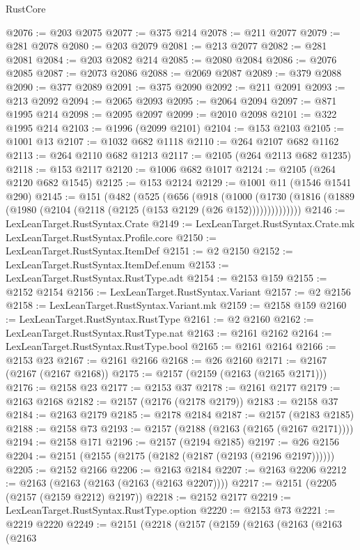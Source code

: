 \begin{lexlean}{RustCore}
\begin{coremodule}
@2076 := @203 @2075
@2077 := @375 @214
@2078 := @211 @2077
@2079 := @281 @2078
@2080 := @203 @2079
@2081 := @213 @2077
@2082 := @281 @2081
@2084 := @203 @2082 @214
@2085 := @2080 @2084
@2086 := @2076 @2085
@2087 := @2073 @2086
@2088 := @2069 @2087
@2089 := @379 @2088
@2090 := @377 @2089
@2091 := @375 @2090
@2092 := @211 @2091
@2093 := @213 @2092
@2094 := @2065 @2093
@2095 := @2064 @2094
@2097 := @871 @1995 @214
@2098 := @2095 @2097
@2099 := @2010 @2098
@2101 := @322 @1995 @214
@2103 := @1996 (@2099 @2101)
@2104 := @153 @2103
@2105 := @1001 @13
@2107 := @1032 @682 @1118
@2110 := @264 @2107 @682 @1162
@2113 := @264 @2110 @682 @1213
@2117 := @2105 (@264 @2113 @682 @1235)
@2118 := @153 @2117
@2120 := @1006 @682 @1017
@2124 := @2105 (@264 @2120 @682 @1545)
@2125 := @153 @2124
@2129 := @1001 @11 (@1546 @1541 @290)
@2145 := @151
    (@482
      (@525
        (@656
          (@918
            (@1000
              (@1730 (@1816 (@1889 (@1980 (@2104 (@2118 (@2125 (@153 @2129 (@26 @152))))))))))))))
@2146 := LexLeanTarget.RustSyntax.Crate
@2149 := LexLeanTarget.RustSyntax.Crate.mk LexLeanTarget.RustSyntax.Profile.core
@2150 := LexLeanTarget.RustSyntax.ItemDef
@2151 := @2 @2150
@2152 := LexLeanTarget.RustSyntax.ItemDef.enum
@2153 := LexLeanTarget.RustSyntax.RustType.adt
@2154 := @2153 @159
@2155 := @2152 @2154
@2156 := LexLeanTarget.RustSyntax.Variant
@2157 := @2 @2156
@2158 := LexLeanTarget.RustSyntax.Variant.mk
@2159 := @2158 @159
@2160 := LexLeanTarget.RustSyntax.RustType
@2161 := @2 @2160
@2162 := LexLeanTarget.RustSyntax.RustType.nat
@2163 := @2161 @2162
@2164 := LexLeanTarget.RustSyntax.RustType.bool
@2165 := @2161 @2164
@2166 := @2153 @23
@2167 := @2161 @2166
@2168 := @26 @2160
@2171 := @2167 (@2167 (@2167 @2168))
@2175 := @2157 (@2159 (@2163 (@2165 @2171)))
@2176 := @2158 @23
@2177 := @2153 @37
@2178 := @2161 @2177
@2179 := @2163 @2168
@2182 := @2157 (@2176 (@2178 @2179))
@2183 := @2158 @37
@2184 := @2163 @2179
@2185 := @2178 @2184
@2187 := @2157 (@2183 @2185)
@2188 := @2158 @73
@2193 := @2157 (@2188 (@2163 (@2165 (@2167 @2171))))
@2194 := @2158 @171
@2196 := @2157 (@2194 @2185)
@2197 := @26 @2156
@2204 := @2151 (@2155 (@2175 (@2182 (@2187 (@2193 (@2196 @2197))))))
@2205 := @2152 @2166
@2206 := @2163 @2184
@2207 := @2163 @2206
@2212 := @2163 (@2163 (@2163 (@2163 (@2163 @2207))))
@2217 := @2151 (@2205 (@2157 (@2159 @2212) @2197))
@2218 := @2152 @2177
@2219 := LexLeanTarget.RustSyntax.RustType.option
@2220 := @2153 @73
@2221 := @2219 @2220
@2249 := @2151
    (@2218
      (@2157
        (@2159
          (@2163
            (@2163
              (@2163
                (@2163

\end{coremodule}
\end{lexlean}
